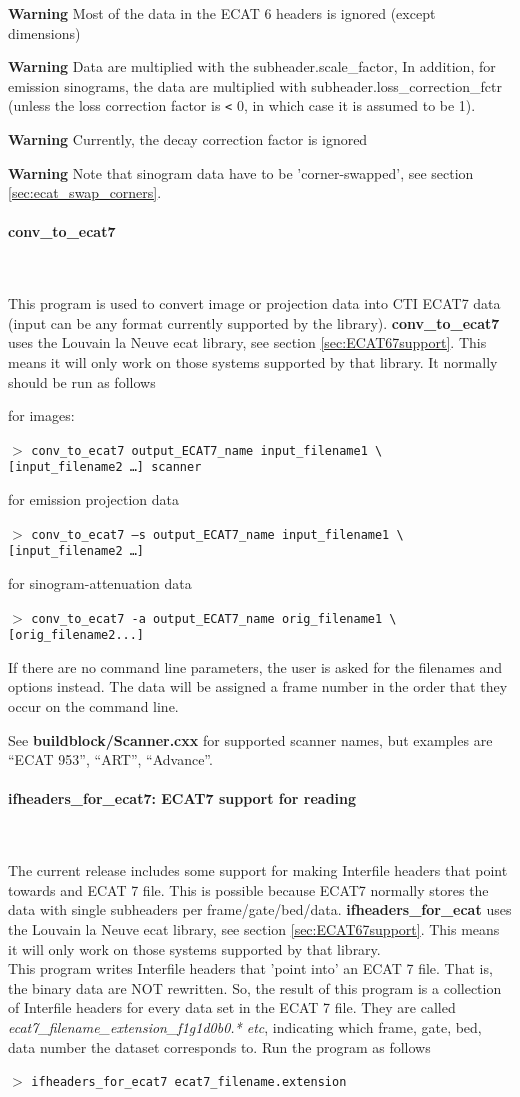 \documentclass{article}
\newcommand{\tab}{\hspace{5mm}}
\newcommand{\subsubsubsection}[1]{\paragraph{#1}\mbox{} \\}
\newcommand{\cmdline}[1]{\par \noindent $>$ \texttt{#1}\par}
\begin{document}
{{\textbf{Warning} Most of the data in the ECAT 6 headers is ignored 
(except dimensions)


\textbf{Warning} Data are multiplied with the subheader.scale\_factor, 
In addition, for emission sinograms, the data are multiplied 
with subheader.loss\_correction\_fctr (unless the loss correction 
factor is \texttt{<} 0, in which case it is assumed to be 1).


\textbf{Warning} Currently, the decay correction factor is ignored 

\textbf{Warning} Note that sinogram data have to be 'corner-swapped', 
see section \ref{sec:ecat_swap_corners}.

{ \subsubsubsection{conv\_to\_ecat7}
}
This program is used to convert image or projection data into 
CTI ECAT7 data (input can be any format currently supported by 
the library). \textbf{conv\_to\_ecat7} uses the Louvain la Neuve ecat 
library, see section \ref{sec:ECAT67support}. This means it will only work on those 
systems supported by that library. It normally should be run 
as follows


for images:
\cmdline{conv\_to\_ecat7 output\_ECAT7\_name input\_filename1 {\textbackslash}\\
{[}input\_filename2 \dots ] scanner}


for emission projection data
\cmdline{conv\_to\_ecat7 --s output\_ECAT7\_name input\_filename1 {\textbackslash}\\
{[}input\_filename2 \dots ]\tab  }


for sinogram-attenuation data
\cmdline{conv\_to\_ecat7 -a output\_ECAT7\_name orig\_filename1 {\textbackslash}\\
{[}orig\_filename2...]}


If there are no command line parameters, the user is asked for 
the filenames and options instead. The data will be assigned 
a frame number in the order that they occur on the command line.


See \textbf{buildblock/Scanner.cxx} for supported scanner names, but 
examples are ``ECAT 953'', ``ART'', ``Advance''. 


{ \subsubsubsection{ifheaders\_for\_ecat7: ECAT7 support for reading}
}
The current release includes some support for making Interfile 
headers that point towards and ECAT 7 file. This is possible 
because ECAT7 normally stores the data with single subheaders 
per frame/gate/bed/data. \textbf{ifheaders\_for\_ecat} uses the Louvain 
la Neuve ecat library, see section \ref{sec:ECAT67support}. 
This means it will only work on those systems 
supported by that library. \\
This program writes Interfile headers that 'point into' an ECAT 
7 file. That is, the binary data are NOT rewritten. So, the result 
of this program is a collection of Interfile headers for every 
data set in the ECAT 7 file. They are called \textit{ecat7\_filename\_extension\_f1g1d0b0.* 
etc}, indicating which frame, gate, bed, data number the dataset 
corresponds to. Run the program as follows
\cmdline{ifheaders\_for\_ecat7 ecat7\_filename.extension}


}}
\end{document}
